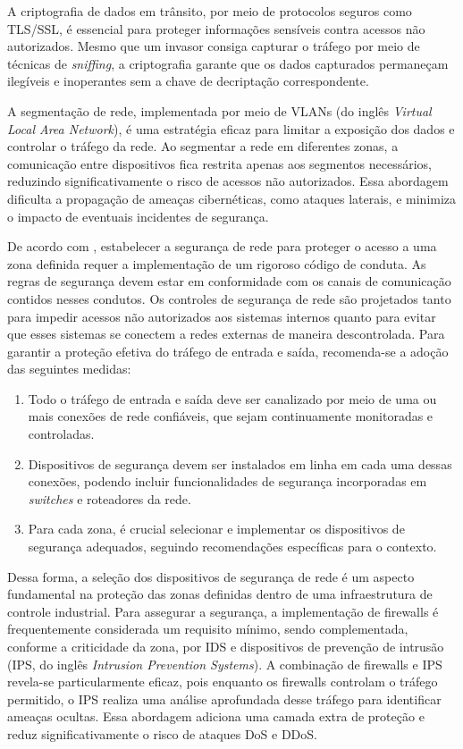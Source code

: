         A criptografia de dados em trânsito, por meio de protocolos seguros como TLS/SSL, é essencial para proteger informações sensíveis contra acessos não autorizados. Mesmo que um invasor consiga capturar o tráfego por meio de técnicas de \textit{sniffing}, a criptografia garante que os dados capturados permaneçam ilegíveis e inoperantes sem a chave de decriptação correspondente.
        
        A segmentação de rede, implementada por meio de VLANs (do inglês \textit{Virtual Local Area Network}), é uma estratégia eficaz para limitar a exposição dos dados e controlar o tráfego da rede. Ao segmentar a rede em diferentes zonas, a comunicação entre dispositivos fica restrita apenas aos segmentos necessários, reduzindo significativamente o risco de acessos não autorizados. Essa abordagem dificulta a propagação de ameaças cibernéticas, como ataques laterais, e minimiza o impacto de eventuais incidentes de segurança.
        
        De acordo com , estabelecer a segurança de rede para proteger o acesso a uma zona definida requer a implementação de um rigoroso código de conduta. As regras de segurança devem estar em conformidade com os canais de comunicação contidos nesses condutos. Os controles de segurança de rede são projetados tanto para impedir acessos não autorizados aos sistemas internos quanto para evitar que esses sistemas se conectem a redes externas de maneira descontrolada. Para garantir a proteção efetiva do tráfego de entrada e saída, recomenda-se a adoção das seguintes medidas:
        
        \begin{enumerate}
            \item Todo o tráfego de entrada e saída deve ser canalizado por meio de uma ou mais conexões de rede confiáveis, que sejam continuamente monitoradas e controladas.
            \item Dispositivos de segurança devem ser instalados em linha em cada uma dessas conexões, podendo incluir funcionalidades de segurança incorporadas em \textit{switches} e roteadores da rede.
            \item Para cada zona, é crucial selecionar e implementar os dispositivos de segurança adequados, seguindo recomendações específicas para o contexto.
        \end{enumerate}    

        Dessa forma, a seleção dos dispositivos de segurança de rede é um aspecto fundamental na proteção das zonas definidas dentro de uma infraestrutura de controle industrial. Para assegurar a segurança, a implementação de firewalls é frequentemente considerada um requisito mínimo, sendo complementada, conforme a criticidade da zona, por IDS e dispositivos de prevenção de intrusão (IPS, do inglês \textit{Intrusion Prevention Systems}). A combinação de firewalls e IPS revela-se particularmente eficaz, pois enquanto os firewalls controlam o tráfego permitido, o IPS realiza uma análise aprofundada desse tráfego para identificar ameaças ocultas. Essa abordagem adiciona uma camada extra de proteção e reduz significativamente o risco de ataques DoS e DDoS.

